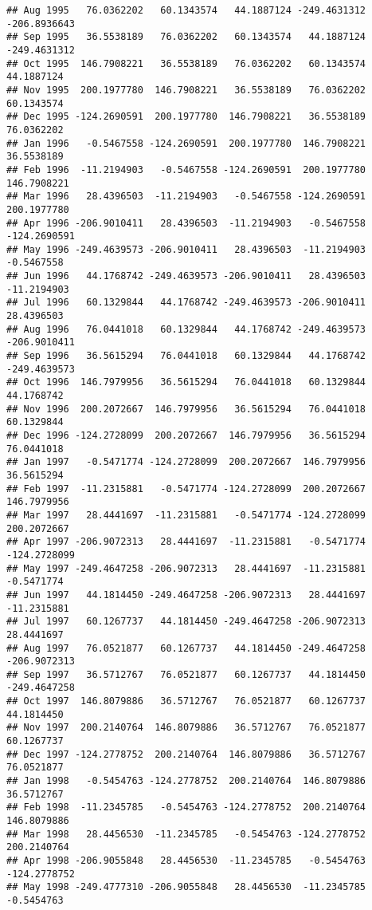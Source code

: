 \documentclass[]{article}
\begin{document}
\begin{verbatim}
## Aug 1995   76.0362202   60.1343574   44.1887124 -249.4631312 -206.8936643
## Sep 1995   36.5538189   76.0362202   60.1343574   44.1887124 -249.4631312
## Oct 1995  146.7908221   36.5538189   76.0362202   60.1343574   44.1887124
## Nov 1995  200.1977780  146.7908221   36.5538189   76.0362202   60.1343574
## Dec 1995 -124.2690591  200.1977780  146.7908221   36.5538189   76.0362202
## Jan 1996   -0.5467558 -124.2690591  200.1977780  146.7908221   36.5538189
## Feb 1996  -11.2194903   -0.5467558 -124.2690591  200.1977780  146.7908221
## Mar 1996   28.4396503  -11.2194903   -0.5467558 -124.2690591  200.1977780
## Apr 1996 -206.9010411   28.4396503  -11.2194903   -0.5467558 -124.2690591
## May 1996 -249.4639573 -206.9010411   28.4396503  -11.2194903   -0.5467558
## Jun 1996   44.1768742 -249.4639573 -206.9010411   28.4396503  -11.2194903
## Jul 1996   60.1329844   44.1768742 -249.4639573 -206.9010411   28.4396503
## Aug 1996   76.0441018   60.1329844   44.1768742 -249.4639573 -206.9010411
## Sep 1996   36.5615294   76.0441018   60.1329844   44.1768742 -249.4639573
## Oct 1996  146.7979956   36.5615294   76.0441018   60.1329844   44.1768742
## Nov 1996  200.2072667  146.7979956   36.5615294   76.0441018   60.1329844
## Dec 1996 -124.2728099  200.2072667  146.7979956   36.5615294   76.0441018
## Jan 1997   -0.5471774 -124.2728099  200.2072667  146.7979956   36.5615294
## Feb 1997  -11.2315881   -0.5471774 -124.2728099  200.2072667  146.7979956
## Mar 1997   28.4441697  -11.2315881   -0.5471774 -124.2728099  200.2072667
## Apr 1997 -206.9072313   28.4441697  -11.2315881   -0.5471774 -124.2728099
## May 1997 -249.4647258 -206.9072313   28.4441697  -11.2315881   -0.5471774
## Jun 1997   44.1814450 -249.4647258 -206.9072313   28.4441697  -11.2315881
## Jul 1997   60.1267737   44.1814450 -249.4647258 -206.9072313   28.4441697
## Aug 1997   76.0521877   60.1267737   44.1814450 -249.4647258 -206.9072313
## Sep 1997   36.5712767   76.0521877   60.1267737   44.1814450 -249.4647258
## Oct 1997  146.8079886   36.5712767   76.0521877   60.1267737   44.1814450
## Nov 1997  200.2140764  146.8079886   36.5712767   76.0521877   60.1267737
## Dec 1997 -124.2778752  200.2140764  146.8079886   36.5712767   76.0521877
## Jan 1998   -0.5454763 -124.2778752  200.2140764  146.8079886   36.5712767
## Feb 1998  -11.2345785   -0.5454763 -124.2778752  200.2140764  146.8079886
## Mar 1998   28.4456530  -11.2345785   -0.5454763 -124.2778752  200.2140764
## Apr 1998 -206.9055848   28.4456530  -11.2345785   -0.5454763 -124.2778752
## May 1998 -249.4777310 -206.9055848   28.4456530  -11.2345785   -0.5454763

\end{verbatim}
\end{document}
